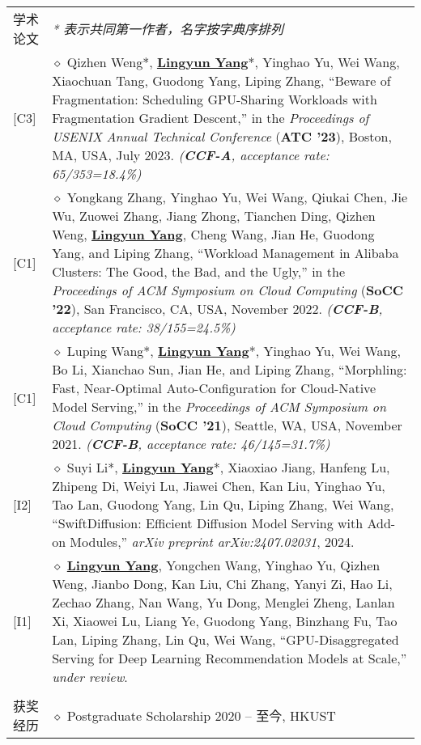 \documentclass[letterpaper, 10pt]{article}
\begin{document}
\begin{longtable}{p{0.7in}p{6.0in}}
{学术论文}
& \textit{* 表示共同第一作者，名字按字典序排列} \\
\hfill [C3]
& $\diamond$ Qizhen Weng*, \textbf{\underline{Lingyun Yang}}*, Yinghao Yu, Wei Wang, Xiaochuan Tang, Guodong Yang, Liping Zhang, “Beware of Fragmentation: Scheduling GPU-Sharing Workloads with Fragmentation Gradient Descent,” in the \textit{Proceedings of USENIX Annual Technical Conference} (\textbf{ATC '23}), Boston, MA, USA, July 2023. \textit{(\textbf{CCF-A}, acceptance rate: 65/353=18.4\%)} \\
\hfill [C1]
& $\diamond$ Yongkang Zhang, Yinghao Yu, Wei Wang, Qiukai Chen, Jie Wu, Zuowei Zhang, Jiang Zhong, Tianchen Ding, Qizhen Weng, \textbf{\underline{Lingyun Yang}}, Cheng Wang, Jian He, Guodong Yang, and Liping Zhang, “Workload Management in Alibaba Clusters: The Good, the Bad, and the Ugly,” in the \textit{Proceedings of ACM Symposium on Cloud Computing} (\textbf{SoCC '22}), San Francisco, CA, USA, November 2022. \textit{(\textbf{CCF-B}, acceptance rate: 38/155=24.5\%)} \\
\hfill [C1]
& $\diamond$ Luping Wang*, \textbf{\underline{Lingyun Yang}}*, Yinghao Yu, Wei Wang, Bo Li, Xianchao Sun, Jian He, and Liping Zhang, “Morphling: Fast, Near-Optimal Auto-Configuration for Cloud-Native Model Serving,” in the \textit{Proceedings of ACM Symposium on Cloud Computing} (\textbf{SoCC '21}), Seattle, WA, USA, November 2021. \textit{(\textbf{CCF-B}, acceptance rate: 46/145=31.7\%)} \\
\hfill [I2]
& $\diamond$ Suyi Li*, \textbf{\underline{Lingyun Yang}}*, Xiaoxiao Jiang, Hanfeng Lu, Zhipeng Di, Weiyi Lu, Jiawei Chen, Kan Liu, Yinghao Yu, Tao Lan, Guodong Yang, Lin Qu, Liping Zhang, Wei Wang, “SwiftDiffusion: Efficient Diffusion Model Serving with Add-on Modules,” \textit{arXiv preprint arXiv:2407.02031}, 2024. \\
\hfill [I1]
& $\diamond$ \textbf{\underline{Lingyun Yang}}, Yongchen Wang, Yinghao Yu, Qizhen Weng, Jianbo Dong, Kan Liu, Chi Zhang, Yanyi Zi, Hao Li, Zechao Zhang, Nan Wang, Yu Dong, Menglei Zheng, Lanlan Xi, Xiaowei Lu, Liang Ye, Guodong Yang, Binzhang Fu, Tao Lan, Liping Zhang, Lin Qu, Wei Wang, “GPU-Disaggregated Serving for Deep Learning Recommendation Models at Scale,” \textit{under review}. \\
& \\

{获奖经历}
& $\diamond$ Postgraduate Scholarship \hfill 2020 -- 至今, HKUST \\


\end{longtable}
\end{document}
